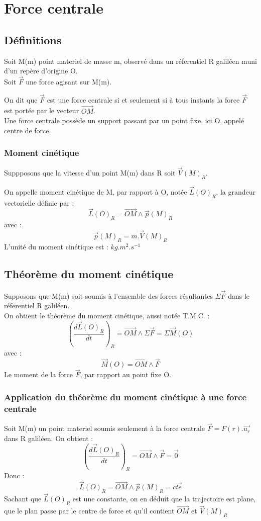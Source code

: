 \chapter{Force centrale}
\section{Définitions}
Soit M(m) point materiel de masse m, observé dans un réferentiel R galiléen muni d'un repère d'origine O.\\
Soit $\overrightarrow{F}$ une force agisant sur M(m).
\begin{de}
On dit que $\overrightarrow{F}$ est une force centrale si et seulement si à tous instants la force $\overrightarrow{F}$ est portée par le vecteur $\overrightarrow{OM}$.\\
Une force centrale possède un support passant par un point fixe, ici O, appelé centre de force.
\end{de}
\subsection{Moment cinétique}
Suppposons que la vitesse d'un point M(m) dans R soit $\overrightarrow{V}(M)_R$.
\begin{de}
On appelle moment cinétique de M, par rapport à O, notée $\overrightarrow{L}(O)_R$, la grandeur vectorielle définie par :
$$\overrightarrow{L}(O)_R = \overrightarrow{OM}\wedge\overrightarrow{p}(M)_R$$
avec :
$$\overrightarrow{p}(M)_R = m.\overrightarrow{V}(M)_R$$
L'unité du moment cinétique est : $kg.m^2.s^{-1}$
\end{de}
\section{Théorème du moment cinétique}
Supposons que M(m) soit soumis à l'ensemble des forces résultantes $\Sigma \overrightarrow{F}$ dans le réferentiel R galiléen.\\
On obtient le théorème du moment cinétique, aussi notée T.M.C. : 
$$\left( \dfrac{d\overrightarrow{L}(O)_R}{dt}\right)_R = \overrightarrow{OM}\wedge\Sigma\overrightarrow{F} = \Sigma\overrightarrow{M}(O) $$
avec :
$$\overrightarrow{M}(O) = \overrightarrow{OM}\wedge\overrightarrow{F}$$
Le moment de la force $\overrightarrow{F}$, par rapport au point fixe O.
\subsection{Application du théorème du moment cinétique à une force centrale}
Soit M(m) un point materiel soumis seulement à la force centrale $\overrightarrow{F}=F(r).\overrightarrow{u_r}$ dans R galiléen.
On obtient :
$$\left( \dfrac{d\overrightarrow{L}(O)_R}{dt}\right)_R = \overrightarrow{OM}\wedge\overrightarrow{F} = \overrightarrow{0}$$
Donc : 
$$\overrightarrow{L}(O)_R = \overrightarrow{OM}\wedge\overrightarrow{p}(M)_R = \overrightarrow{cte}$$
Sachant que $\overrightarrow{L}(O)_R$ est une constante, on en déduit que la trajectoire est plane, que le plan passe par le centre de force et qu'il contient $\overrightarrow{OM}$ et $\overrightarrow{V}(M)_R$
